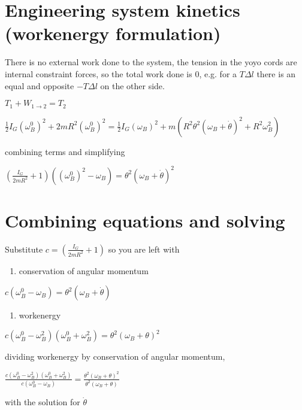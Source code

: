 \documentclass[letterpaper,10pt,english]{sphinxmanual}
\begin{document}
\section{Engineering system \sphinxhyphen{} kinetics (work\sphinxhyphen{}energy formulation)}
\label{\detokenize{module_04/yoyo-despin_02:engineering-system-kinetics-work-energy-formulation}}
There is no external work done to the system, the tension in the yoyo
cords are internal constraint forces, so the total work done is 0, e.g.
for a \(T\Delta l\) there is an equal and opposite \(-T\Delta l\) on
the other side.

\(T_1 + W_{1\rightarrow2} = T_2\)

\(\frac{1}{2}I_G (\omega_B^0)^2 + 2mR^2(\omega_B^0)^2 = 
\frac{1}{2}I_G (\omega_B)^2 +
m(R^2\theta^2(\omega_B+\dot{\theta})^2+R^2\omega_B^2)\)

combining terms and simplifying

\(\left(\frac{I_G}{2mR^2}+1\right)( (\omega_B^0)^2-\omega_B)  = 
\theta^2(\omega_B+\dot{\theta})^2\)


\section{Combining equations and solving}
\label{\detokenize{module_04/yoyo-despin_02:combining-equations-and-solving}}
Substitute \(c = \left(\frac{I_G}{2mR^2}+1\right)\) so you are left with
\begin{enumerate}
%
\item {} 
conservation of angular momentum

\end{enumerate}

\(c(\omega_B^0 - \omega_B) = \theta^2(\omega_B+\dot{\theta})\)
\begin{enumerate}
%
\item {} 
work\sphinxhyphen{}energy

\end{enumerate}

\(c(\omega_B^0-\omega_B^2)(\omega_B^0+\omega_B^2) = \theta^2(\omega_B+\theta)^2\)

dividing work\sphinxhyphen{}energy by conservation of angular momentum,

\(\frac{c(\omega_B^0-\omega_B^2)(\omega_B^0+\omega_B^2)}{c(\omega_B^0 - \omega_B)} = 
\frac{\theta^2(\omega_B+\theta)^2}{\theta^2(\omega_B+\theta)}\)

with the solution for \(\dot{\theta}\)
\end{document}
